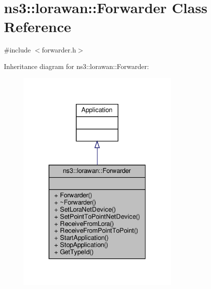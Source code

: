 \hypertarget{classns3_1_1lorawan_1_1Forwarder}{}\section{ns3\+:\+:lorawan\+:\+:Forwarder Class Reference}
\label{classns3_1_1lorawan_1_1Forwarder}


{\ttfamily \#include $<$forwarder.\+h$>$}



Inheritance diagram for ns3\+:\+:lorawan\+:\+:Forwarder\+:
\nopagebreak
\begin{figure}[H]
\begin{center}
\leavevmode
\includegraphics[width=229pt]{classns3_1_1lorawan_1_1Forwarder__inherit__graph}
\end{center}
\end{figure}


